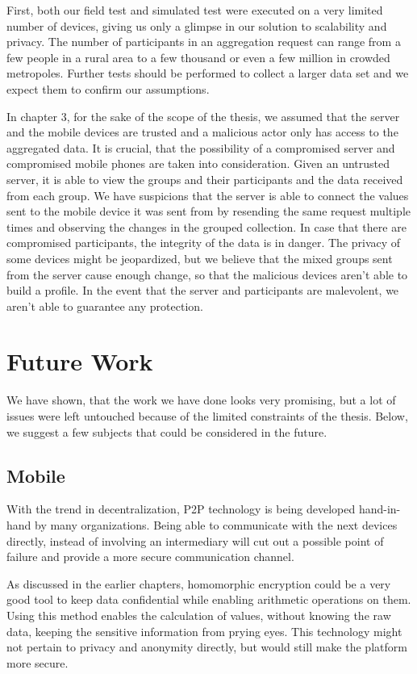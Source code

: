 First, both our field test and simulated test were executed on a very limited number of devices, giving us only a glimpse in our solution to scalability and privacy. The number of participants in an aggregation request can range from a few people in a rural area to a few thousand or even a few million in crowded metropoles. Further tests should be performed to collect a larger data set and we expect them to confirm our assumptions.

In chapter 3, for the sake of the scope of the thesis, we assumed that the server and the mobile devices are trusted and a malicious actor only has access to the aggregated data. It is crucial, that the possibility of a compromised server and compromised mobile phones are taken into consideration. Given an untrusted server, it is able to view the groups and their participants and the data received from each group. We have suspicions that the server is able to connect the values sent to the mobile device it was sent from by resending the same request multiple times and observing the changes in the grouped collection. In case that there are compromised participants, the integrity of the data is in danger. The privacy of some devices might be jeopardized, but we believe that the mixed groups sent from the server cause enough change, so that the malicious devices aren't able to build a profile. In the event that the server and participants are malevolent, we aren't able to guarantee any protection.

\section{Future Work}
We have shown, that the work we have done looks very promising, but a lot of issues were left untouched because of the limited constraints of the thesis. Below, we suggest a few subjects that could be considered in the future. 

\subsection{Mobile}
With the trend in decentralization, P2P technology is being developed hand-in-hand by many organizations. Being able to communicate with the next devices directly, instead of involving an intermediary will cut out a possible point of failure and provide a more secure communication channel.

As discussed in the earlier chapters, homomorphic encryption could be a very good tool to keep data confidential while enabling arithmetic operations on them. Using this method enables the calculation of values, without knowing the raw data, keeping the sensitive information from prying eyes. This technology might not pertain to privacy and anonymity directly, but would still make the platform more secure.

